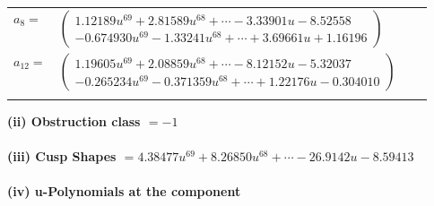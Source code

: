 \documentclass[1p]{elsarticle_modified}
\theoremstyle{definition}
\begin{document}
\begin{tabular}{m{7pt} m{180pt} m{7pt} m{180pt} }
\flushright $a_{8}=$&$\begin{pmatrix}1.12189 u^{69}+2.81589 u^{68}+\cdots-3.33901 u-8.52558\\-0.674930 u^{69}-1.33241 u^{68}+\cdots+3.69661 u+1.16196\end{pmatrix}$ \\
\flushright $a_{12}=$&$\begin{pmatrix}1.19605 u^{69}+2.08859 u^{68}+\cdots-8.12152 u-5.32037\\-0.265234 u^{69}-0.371359 u^{68}+\cdots+1.22176 u-0.304010\end{pmatrix}$\\&\end{tabular}
\flushleft \textbf{(ii) Obstruction class $= -1$}\\~\\
\flushleft \textbf{(iii) Cusp Shapes $= 4.38477 u^{69}+8.26850 u^{68}+\cdots-26.9142 u-8.59413$}\\~\\
\newpage\renewcommand{\arraystretch}{1}
\flushleft \textbf{(iv) u-Polynomials at the component}\newline \\
\end{document}
